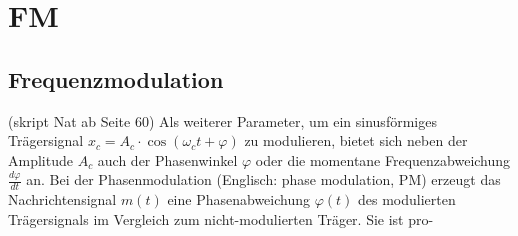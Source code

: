 %
%
%
\section{FM
\label{fm:section:teil1}}
\subsection{Frequenzmodulation}
(skript Nat ab Seite 60)
Als weiterer Parameter, um ein sinusförmiges Trägersignal \(x_c = A_c \cdot \cos(\omega_c t + \varphi)\) zu modulieren,
bietet sich neben der Amplitude \(A_c\) auch der Phasenwinkel \(\varphi\) oder die momentane Frequenzabweichung \(\frac{d\varphi}{dt}\) an.
Bei der Phasenmodulation (Englisch: phase modulation, PM) erzeugt das Nachrichtensignal \(m(t)\) eine Phasenabweichung \(\varphi(t)\) des modulierten Trägersignals im Vergleich zum nicht-modulierten Träger. Sie ist pro-
